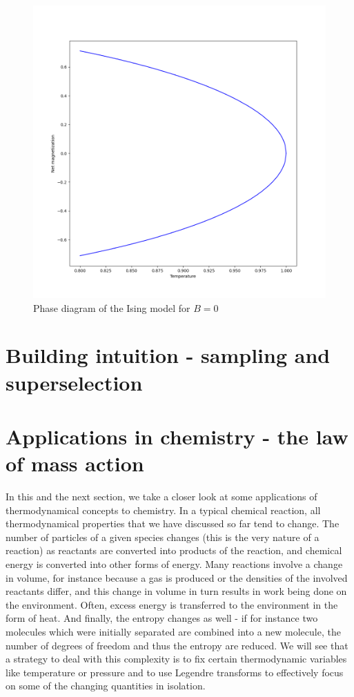 \documentclass[a4paper, draft]{article}
\theoremstyle{own}
\theoremstyle{remark}
\begin{document}
\begin{figure}[ht]
	\centering
	\includegraphics[scale=.5]{IsingModelCriticalTemperature	}
	\caption{Phase diagram of the Ising model for $B = 0$}
	\label{fig:IsingModelCritical}
\end{figure}


\section{Building intuition - sampling and superselection}


	

\section{Applications in chemistry - the law of mass action}

In this and the next section, we take a closer look at some applications of thermodynamical concepts to chemistry. In a typical chemical reaction, all thermodynamical properties that we have discussed so far tend to change. The number of particles of a given species changes (this is the very nature of a reaction) as reactants are converted into products of the reaction, and chemical energy is converted into other forms of energy. Many reactions involve a change in volume, for instance because a gas is produced or the densities of the involved reactants differ, and this change in volume in turn results in work being done on the environment. Often, excess energy is transferred to the environment in the form of heat. And finally, the entropy changes as well - if for instance two molecules which were initially separated are combined into a new molecule, the number of degrees of freedom and thus the entropy are reduced. We will see that a strategy to deal with this complexity is to fix certain thermodynamic variables like temperature or pressure and to use Legendre transforms to effectively focus on some of the changing quantities in isolation.
\end{document}
